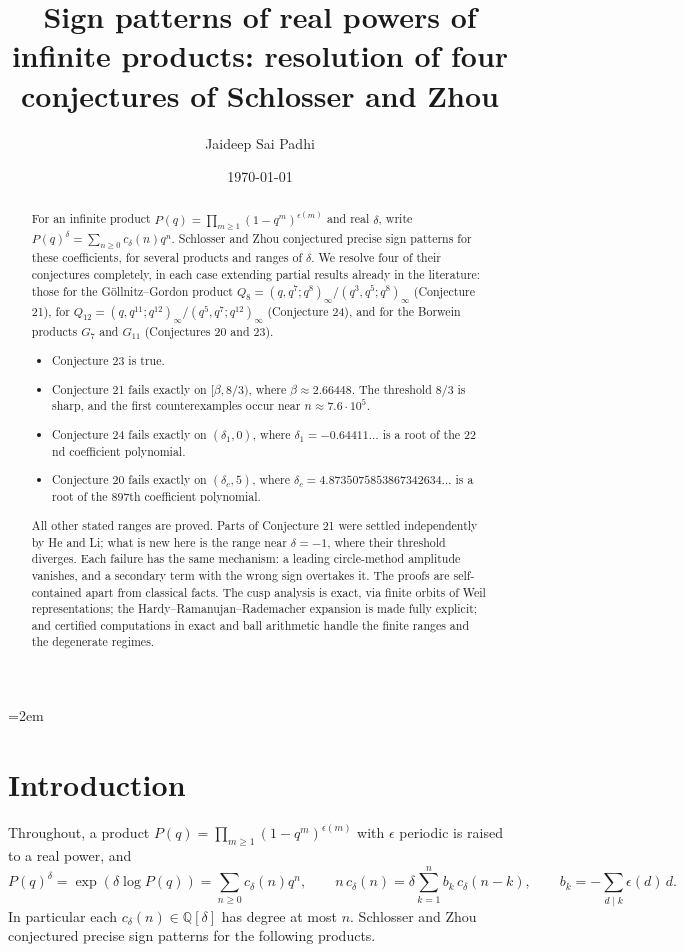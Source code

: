 \documentclass[11pt]{amsart}
\title[Sign patterns of real powers of infinite products]{Sign patterns of real powers of infinite products: resolution of four conjectures of Schlosser and Zhou}
\author{Jaideep Sai Padhi}
\date{\today}
\theoremstyle{remark}
\theoremstyle{definition}
\newcommand{\Q}{\mathbb Q}
\begin{document}
\emergencystretch=2em
\begin{abstract}
For an infinite product $P(q)=\prod_{m\ge1}(1-q^m)^{\epsilon(m)}$ and real $\delta$, write $P(q)^\delta=\sum_{n\ge0}c_\delta(n)q^n$. Schlosser and Zhou conjectured precise sign patterns for these coefficients, for several products and ranges of $\delta$. We resolve four of their conjectures completely, in each case extending partial results already in the literature: those for the G\"ollnitz--Gordon product $Q_8=(q,q^7;q^8)_\infty/(q^3,q^5;q^8)_\infty$ (Conjecture 21), for $Q_{12}=(q,q^{11};q^{12})_\infty/(q^5,q^7;q^{12})_\infty$ (Conjecture 24), and for the Borwein products $G_7$ and $G_{11}$ (Conjectures 20 and 23).
\begin{itemize}[leftmargin=1.5em]
\item Conjecture 23 is true.
\item Conjecture 21 fails exactly on $[\beta,8/3)$, where $\beta\approx2.66448$. The threshold $8/3$ is sharp, and the first counterexamples occur near $n\approx7.6\cdot10^5$.
\item Conjecture 24 fails exactly on $(\delta_1,0)$, where $\delta_1=-0.64411\ldots$ is a root of the $22$nd coefficient polynomial.
\item Conjecture 20 fails exactly on $(\delta_c,5)$, where $\delta_c=4.8735075853867342634\ldots$ is a root of the $897$th coefficient polynomial.
\end{itemize}
All other stated ranges are proved. Parts of Conjecture 21 were settled independently by He and Li; what is new here is the range near $\delta=-1$, where their threshold diverges. Each failure has the same mechanism: a leading circle-method amplitude vanishes, and a secondary term with the wrong sign overtakes it. The proofs are self-contained apart from classical facts. The cusp analysis is exact, via finite orbits of Weil representations; the Hardy--Ramanujan--Rademacher expansion is made fully explicit; and certified computations in exact and ball arithmetic handle the finite ranges and the degenerate regimes.
\end{abstract}

\maketitle

\section{Introduction}
Throughout, a product $P(q)=\prod_{m\ge1}(1-q^m)^{\epsilon(m)}$ with $\epsilon$ periodic is raised to a real power, and
\begin{equation}\label{eq:rec}
P(q)^\delta=\exp(\delta\log P(q))=\sum_{n\ge0}c_\delta(n)q^n,\qquad n\,c_\delta(n)=\delta\sum_{k=1}^nb_k\,c_\delta(n-k),\qquad b_k=-\sum_{d\mid k}\epsilon(d)\,d .
\end{equation}
In particular each $c_\delta(n)\in\Q[\delta]$ has degree at most $n$. Schlosser and Zhou \cite[Appendix A]{SZ} conjectured precise sign patterns for the following products.
\end{document}
